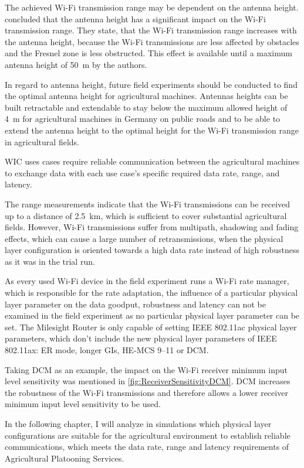 The achieved Wi-Fi transmission range may be dependent on the antenna height. \textcite{brinkhoff_characterization_2017} concluded that
the antenna height has a significant impact on the Wi-Fi transmission range.
They state, that the Wi-Fi transmission range increases
with the antenna height, because the Wi-Fi transmissions are less affected by obstacles and the Fresnel zone is less obstructed.
This effect is available until a maximum antenna height of \SI{50}{\metre} by the authors.

In regard to antenna height, future field experiments should be conducted to find the optimal antenna height for agricultural machines.
Antennas heights can be built retractable and extendable to stay below the maximum allowed height of \SI{4}{\metre} for agricultural machines in Germany on
public roads and to be able to extend the antenna height to the optimal height for the Wi-Fi transmission range in agricultural fields.


\ac{WIC} uses cases require reliable communication between the agricultural machines to exchange data
with each use case's specific required data rate, range, and latency.

The range measurements indicate that the Wi-Fi transmissions can be received up to a distance of \SI{2.5}{\kilo\metre},
which is sufficient to cover substantial agricultural fields.
However, Wi-Fi transmissions suffer from multipath, shadowing and fading effects, which can cause a large number of retransmissions,
when the physical layer configuration is oriented towards a high data rate instead of high robustness as it was
in the trial run.

As every used Wi-Fi device in the field experiment runs a Wi-Fi rate manager, which is responsible for the rate adaptation,
the influence of a particular physical layer parameter on the data goodput, robustness and latency can not be examined in the field experiment as no particular physical layer parameter can be set.
The Milesight Router is only capable of setting IEEE 802.11ac physical layer parameters, which don't include the new physical layer parameters of IEEE 802.11ax:
\ac{ER} mode, longer \ac{GI}s, \ac{HE}-\ac{MCS} \numrange{9}{11} or \ac{DCM}.

Taking \ac{DCM} as an example, the impact on the Wi-Fi receiver minimum input level sensitivity was mentioned in \autoref{fig:ReceiverSensitivityDCM}. \ac{DCM}
increases the robustness of the Wi-Fi transmissions and therefore allows a lower receiver minimum input level sensitivity to be used.

In the following chapter, I will analyze in simulations which physical layer
configurations are suitable for the agricultural environment to establish reliable communications,
which meets the data rate, range and latency requirements of Agricultural Platooning Services.
